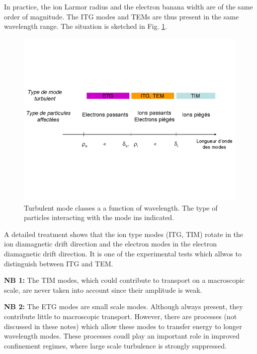 In practice, the ion Larmor radius and the electron banana width are of the same order of magnitude. The ITG modes and  TEMs are thus present in the same wavelength range. The situation is sketched in Fig.  \ref{fig:_schéma_modes_turb}.
\begin{figure}[htbp]
	\centering
		\includegraphics{Fig_schema_modes_turb.png}
	\caption{Turbulent mode classes a a function of wavelength. The type of particles interacting with the mode ins indicated.}
	\label{fig:_schéma_modes_turb}
\end{figure}

A detailed treatment shows that the ion type modes (ITG, TIM) rotate in the ion diamagnetic drift direction and the electron modes in the electron diamagnetic drift direction. It is one of the experimental tests which allwos to distinguish between ITG and TEM.

\textbf{NB 1:} The TIM modes, which could contribute to transport on a macroscopic scale, are never taken into account since their amplitude is weak.

\textbf{NB 2:} The ETG modes are small scale modes. Although always present, they contribute little to macroscopic transport. However, there are processes (not discussed in these notes) which allow these modes to transfer energy to longer wavelength modes. These processes coudl play an important role in improved confinement regimes, where large scale turbulence is strongly suppressed.





		
